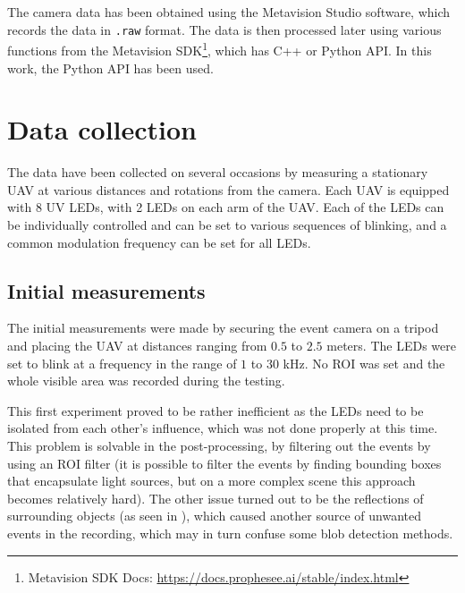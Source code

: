 The camera data has been obtained using the Metavision Studio software, which records the data in \texttt{.raw} format.
The data is then processed later using various functions from the Metavision SDK\footnote{Metavision SDK Docs: \url{https://docs.prophesee.ai/stable/index.html}},
which has C++ or Python API. In this work, the Python API has been used.

\section{Data collection}

The data have been collected on several occasions by measuring a stationary UAV at various distances and rotations from the camera.
Each UAV is equipped with 8 UV LEDs, with 2 LEDs on each arm of the UAV. Each of the LEDs can be individually controlled
and can be set to various sequences of blinking, and a common modulation frequency can be set for all LEDs.

\subsection{Initial measurements}

The initial measurements were made by securing the event camera on a tripod and placing the UAV at distances ranging from
$0.5$ to $2.5$ meters. The LEDs were set to blink at a frequency in the range of $1$ to $30$ kHz. No \ac{ROI} was set
and the whole visible area was recorded during the testing.

This first experiment proved to be rather inefficient as the LEDs need to be isolated from each other's influence, which
was not done properly at this time. This problem is solvable in the post-processing, by filtering out the events
by using an ROI filter (it is possible to filter the events by finding bounding boxes
that encapsulate light sources, but on a more complex scene this approach becomes relatively hard).
The other issue turned out to be the reflections of surrounding objects (as seen in ), which caused
another source of unwanted events in the recording, which may in turn confuse some blob detection methods.

